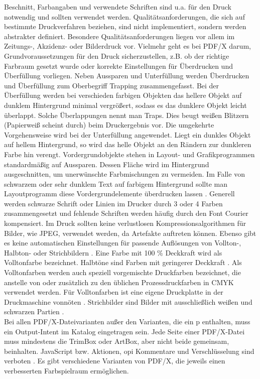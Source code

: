 Beschnitt, Farbangaben und verwendete Schriften sind u.a. für den Druck notwendig und sollten verwendet werden. Qualitätsanforderungen, die sich auf bestimmte Druckverfahren beziehen, sind nicht implementiert, sondern werden abstrakter definiert. Besondere Qualitätsanforderungen liegen vor allem im Zeitungs-, Akzidenz- oder Bilderdruck vor. Vielmehr geht es bei PDF/X darum, Grundvoraussetzungen für den Druck sicherzustellen, z.B. ob der richtige Farbraum gesetzt wurde oder korrekte Einstellungen für Überdrucken und Überfüllung vorliegen. Neben Aussparen und Unterfüllung werden Überdrucken und Überfüllung zum Oberbegriff Trapping zusammengefasst. Bei der Überfüllung werden bei verschieden farbigen Objekten das hellere Objekt auf dunklem Hintergrund minimal vergrößert, sodass es das dunklere Objekt leicht überlappt. Solche Überlappungen nennt man Traps. Dies beugt weißen Blitzern (Papierweiß scheint durch) beim Druckergebnis vor. Die umgekehrte Vorgehensweise wird bei der Unterfüllung angewendet. Liegt ein dunkles Objekt auf hellem Hintergrund, so wird das helle Objekt an den Rändern zur dunkleren Farbe hin verengt. Vordergrundobjekte stehen in Layout- und Grafikprogrammen standardmäßig auf Aussparen. Dessen Fläche wird im Hintergrund ausgeschnitten, um unerwünschte Farbmischungen zu vermeiden. Im Falle von schwarzem oder sehr dunklem Text auf farbigem Hintergrund sollte man Layoutprogramm diese Vordergrundelemente überdrucken lassen \cite{kompendium}. Generell werden schwarze Schrift oder Linien im Drucker durch 3 oder 4 Farben zusammengesetzt und fehlende Schriften werden häufig durch den Font Courier kompensiert. Im Druck sollten keine verlustlosen Kompressionsalgorithmen für Bilder, wie JPEG, verwendet werden, da Artefakte auftreten können. Ebenso gibt es keine automatischen Einstellungen für passende Auflösungen von Vollton-, Halbton- oder Strichbildern \cite{adobe-pdf-x}. Eine Farbe mit 100 \% Deckkraft wird als Volltonfarbe bezeichnet. Halbtöne sind Farben mit geringerer Deckkraft \cite{halb-voll}. Als Volltonfarben werden auch speziell vorgemischte Druckfarben bezeichnet, die anstelle von oder zusätzlich zu den üblichen Prozessdruckfarben in CMYK verwendet werden. Für Volltonfarben ist eine eigene Druckplatte in der Druckmaschine vonnöten \cite{adobe-voll}. Strichbilder sind Bilder mit ausschließlich weißen und schwarzen Partien \cite{strich}. \\
Bei allen PDF/X-Dateivarianten außer den Varianten, die ein p enthalten, muss ein Output-Intent im Katalog eingetragen sein. Jede Seite einer PDF/X-Datei muss mindestens die TrimBox oder ArtBox, aber nicht beide gemeinsam, beinhalten. JavaScript bzw. Aktionen, \gls{opi} Kommentare und Verschlüsselung sind verboten \cite{schneeberger}. Es gibt verschiedene Varianten von PDF/X, die jeweils einen verbesserten Farbspielraum ermöglichen. 

